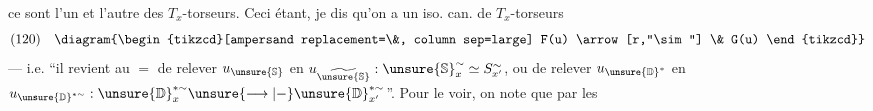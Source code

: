 ce sont l'un et l'autre des $T_x$-torseurs.
Ceci étant, je dis qu'on a un iso. can. de $T_x$-torseurs
\[
(120)\quad
\diagram{\begin{tikzcd}[ampersand replacement=\&, column sep=large]
F(u) \arrow[r,"\sim"] \& G(u)
\end{tikzcd}}
\]
--- i.e. ``il revient au $=$ de relever $u_{\unsure{\mathbb{S}}}$ en
$u_{\widetilde{\unsure{\mathbb{S}}}}:
\unsure{\mathbb{S}}_x^{\sim}\simeq S_{x'}^{\sim}$,
ou de relever $u_{\unsure{\mathbb{D}}^*}$ en
$u_{\unsure{\mathbb{D}}^{*\sim}}:
\unsure{\mathbb{D}}_x^{*\sim}\unsure{\longrightarrow|-}
\unsure{\mathbb{D}}_{x'}^{*\sim}$''.
Pour le voir, on note que par
 les




